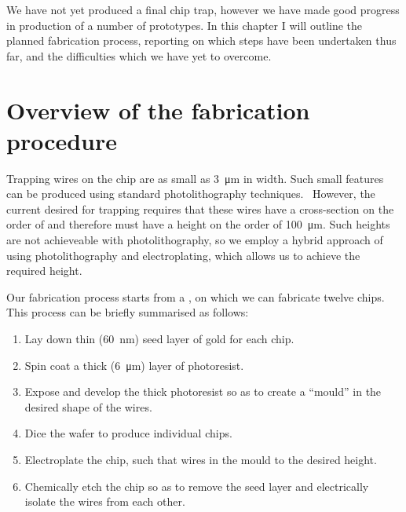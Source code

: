 We have not yet produced a final chip trap, however we have made good progress
in production of a number of prototypes. In this chapter I will outline the
planned fabrication process, reporting on which steps have been undertaken thus
far, and the difficulties which we have yet to overcome.

\section{Overview of the fabrication procedure}

Trapping wires on the chip are as small as \SI{3}{\micro\meter} in width. Such
small features can be produced using standard photolithography
techniques.~\cite{} However, the current desired for trapping requires that
these wires have a cross-section on the order of  and therefore must
have a height on the order of \SI{100}{\micro\meter}. Such heights are not
achieveable with photolithography, so we employ a hybrid approach of using
photolithography and electroplating, which allows us to achieve the required
height.

Our fabrication process starts from a , on which we can fabricate twelve  chips. This process
can be briefly summarised as follows:
\begin{enumerate}
\item Lay down thin (\SI{60}{\nano\meter}) seed layer of gold for each chip.
\item Spin coat a thick (\SI{6}{\micro\meter}) layer of photoresist.
\item Expose and develop the thick photoresist so as to create a ``mould''
in the desired shape of the wires.
\item Dice the wafer to produce individual chips.
\item Electroplate the chip, such that wires  in the mould to the
desired height.
\item Chemically etch the chip so as to remove the seed layer and
electrically isolate the wires from each other.
\end{enumerate}
